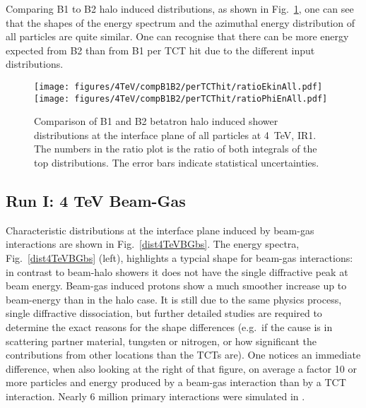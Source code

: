 Comparing B1 to B2 halo induced distributions, as shown in Fig.~\ref{fig:comp4TeVB1B2}, one can see that the shapes of the energy spectrum and the azimuthal energy distribution of all particles are quite similar. One can recognise that there can be more energy expected from B2 than from B1 per TCT hit due to the different input distributions.



\begin{figure}%
\begin{center}
\texttt{[image: figures/4TeV/compB1B2/perTCThit/ratioEkinAll.pdf]}
\texttt{[image: figures/4TeV/compB1B2/perTCThit/ratioPhiEnAll.pdf]}
\end{center}
\vspace{-0.6cm}
 \caption{Comparison of B1 and B2 betatron halo induced shower distributions at the interface plane of all particles at 4~TeV, IR1. The numbers in the ratio plot is the ratio of both integrals of the top distributions. The error bars indicate statistical uncertainties.
  \label{fig:comp4TeVB1B2}}
\end{figure}


\subsection{Run I: 4 TeV Beam-Gas}

Characteristic distributions at the interface plane induced by beam-gas interactions are shown in Fig.~\ref{dist4TeVBGbs}. The energy spectra, Fig.~\ref{dist4TeVBGbs} (left), highlights a typcial shape for beam-gas interactions: in contrast to beam-halo showers it does not have the single diffractive peak at beam energy. Beam-gas induced protons show a much smoother increase up to beam-energy than in the halo case. It is still due to the same physics process, single diffractive dissociation, but further detailed studies are required to determine the exact reasons for the shape differences (e.g.~if the cause is in scattering partner material, tungsten or nitrogen, or how significant the contributions from other locations than the TCTs are).
One notices an immediate difference, when also looking at the right of that figure, on average a factor 10 or more particles and energy produced by a beam-gas interaction than by a TCT interaction. Nearly 6 million primary interactions were simulated in \fluka.%


